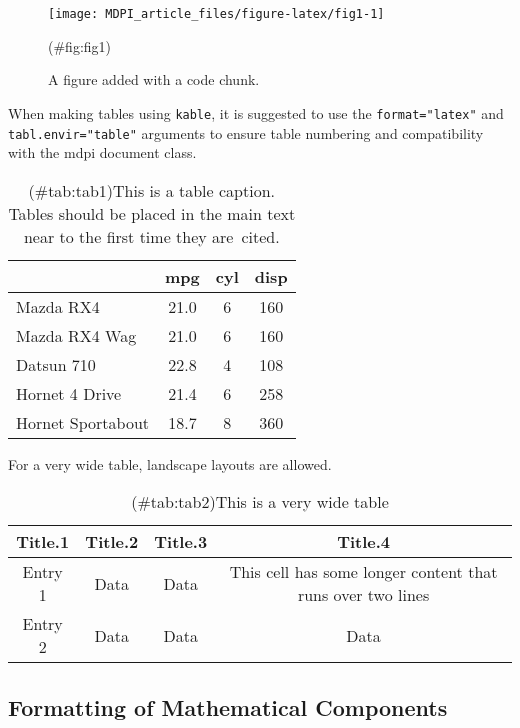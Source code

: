 \documentclass[
]{article}
\begin{document}
\begin{figure}[h!]

{\centering \texttt{[image: MDPI\_article\_files/figure-latex/fig1-1]} 

}

\caption{A figure added with a code chunk.\label{fig:fig1}}(\#fig:fig1)
\end{figure}

When making tables using \texttt{kable}, it is suggested to use
the \texttt{format="latex"} and \texttt{tabl.envir="table"} arguments
to ensure table numbering and compatibility with the mdpi
document class.

\begin{table}[H]

\caption{(\#tab:tab1)This is a table caption. Tables should be placed in the 
             main text near to the first time they are~cited.}
\begin{tabular}[t]{lccc}
\toprule
  & mpg & cyl & disp\\
\midrule
Mazda RX4 & 21.0 & 6 & 160\\
Mazda RX4 Wag & 21.0 & 6 & 160\\
Datsun 710 & 22.8 & 4 & 108\\
Hornet 4 Drive & 21.4 & 6 & 258\\
Hornet Sportabout & 18.7 & 8 & 360\\
\bottomrule
\end{tabular}
\end{table}

For a very wide table, landscape layouts are allowed.

\startlandscape

\begin{table}[H]

\caption{(\#tab:tab2)This is a very wide table}
\begin{tabular}[t]{cccc}
\toprule
Title.1 & Title.2 & Title.3 & Title.4\\
\midrule
Entry 1 & Data & Data & This cell has some longer content that runs over
                               two lines\\
Entry 2 & Data & Data & Data\\
\bottomrule
\end{tabular}
\end{table}

\finishlandscape

\hypertarget{formatting-of-mathematical-components}{%
\subsection{Formatting of Mathematical Components}\label{formatting-of-mathematical-components}}
\end{document}
